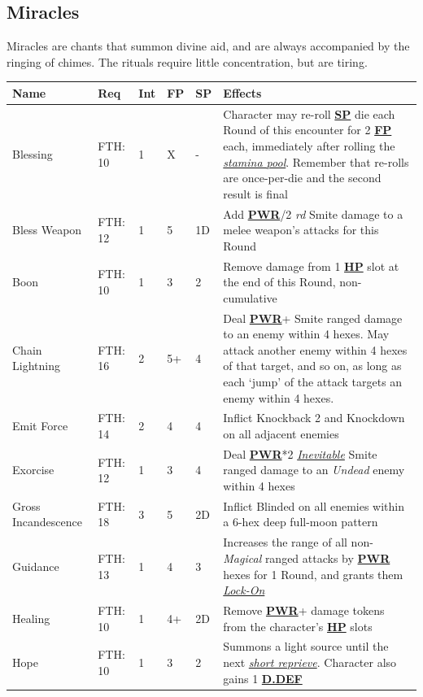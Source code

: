 \documentclass[12pt]{article}
\newcommand{\refto}[1]{\hyperlink{#1}{\textbf{#1}}}
\newcommand{\reftoit}[1]{\hyperlink{#1}{\emph{#1}}}
\begin{document}
\subsection{Miracles}
Miracles are chants that summon divine aid, and are always accompanied by the ringing of chimes. The rituals require little concentration, but are tiring.
\begin{center}
\begin{tabularx}{\textwidth}{p{}p{}p{}p{}p{}p{}}
\hline
\textbf{Name} & \textbf{Req} & \textbf{Int} & \textbf{FP} & \textbf{SP} & \textbf{Effects} \\
\hline
Blessing & FTH: 10 & 1 & X & - & Character may re-roll \refto{SP} die each Round of this encounter for 2 \refto{FP} each, immediately after rolling the \reftoit{stamina pool}. Remember that re-rolls are once-per-die and the second result is final\\
Bless Weapon & FTH: 12 & 1 & 5 & 1D & Add \refto{PWR}/2 \emph{rd} Smite damage to a melee weapon’s attacks for this Round \\
Boon & FTH: 10 & 1 & 3 & 2 & Remove damage from 1 \refto{HP} slot at the end of this Round, non-cumulative\\
Chain Lightning & FTH: 16 & 2 & 5+ & 4 & Deal \refto{PWR}+ Smite ranged damage to an enemy within 4 hexes. \newline
May attack another enemy within 4 hexes of that target, and so on, as long as each ‘jump’ of the attack targets an enemy within 4 hexes. \\
Emit Force & FTH: 14 & 2 & 4 & 4 & Inflict Knockback 2 and Knockdown on all adjacent enemies \\
Exorcise & FTH: 12 & 1 & 3 & 4 & Deal \refto{PWR}*2 \reftoit{Inevitable} Smite ranged damage to an \emph{Undead} enemy within 4 hexes \\
Gross Incandescence & FTH: 18 & 3 & 5 & 2D & Inflict Blinded on all enemies within a 6-hex deep full-moon pattern \\
Guidance & FTH: 13 & 1 & 4 & 3 & Increases the range of all non-\emph{Magical} ranged attacks by \refto{PWR} hexes for 1 Round, and grants them \reftoit{Lock-On} \\
Healing & FTH: 10 & 1 & 4+ & 2D & Remove \refto{PWR}+ damage tokens from the character’s \refto{HP} slots \\
Hope & FTH: 10 & 1 & 3 & 2 & Summons a light source until the next \reftoit{short reprieve}. Character also gains 1 \refto{D.DEF} \\

\end{tabularx}
\end{center}
\end{document}
